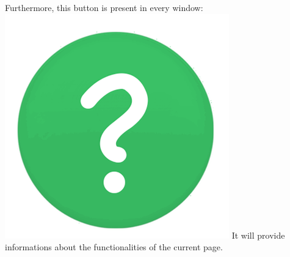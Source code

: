 Furthermore, this button is present in every window: \includegraphics[scale=0.08]{./Images/help} It will provide informations about the functionalities of the current page.